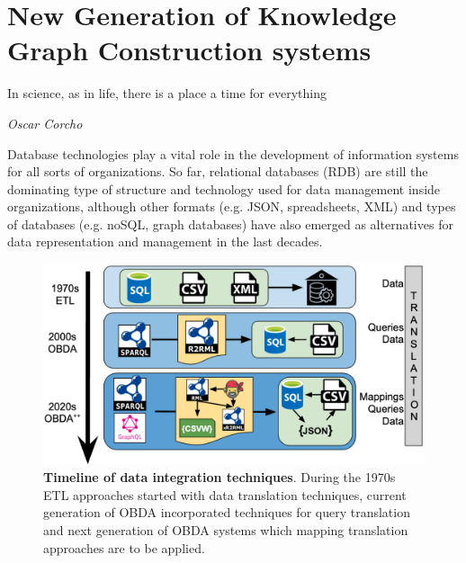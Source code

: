 
\chapter{New Generation of Knowledge Graph Construction systems}
\label{chapter:mappig-translation}

\epigraph{In science, as in life, there is a place a time for everything}{\textit{Oscar Corcho}}


Database technologies play a vital role in the development of information systems for all sorts of organizations. So far, relational databases (RDB) are still the dominating type of structure and technology used for data management inside organizations, although other formats (e.g. JSON, spreadsheets, XML) and types of databases (e.g. noSQL, graph databases) have also emerged as alternatives for data representation and management in the last decades. 

\begin{figure}[!ht]
    \centering
    \includegraphics[width=1\columnwidth]{./figures/mt_obda_timeline.png}
    \caption[Timeline of data integration techniques]{\textbf{Timeline of data integration techniques}. During the 1970s ETL approaches started with data translation techniques, current generation of OBDA incorporated techniques for query translation and next generation of OBDA systems which mapping translation approaches are to be applied.%
    }
    \label{fig:obdatimeline}
\end{figure}

